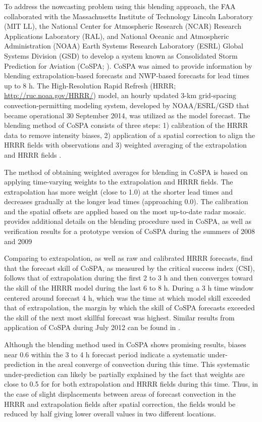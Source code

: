 \documentclass[12pt]{article}
\begin{document}
 To address the nowcasting problem using this blending approach, the FAA collaborated with the Massachusetts Institute of Technology Lincoln Laboratory (MIT LL), the National Center for Atmospheric Research (NCAR) Research Applications Laboratory (RAL), and National Oceanic and Atmospheric Administration (NOAA) Earth Systems Research Laboratory (ESRL) Global Systems Division (GSD) to develop a system known as Consolidated Storm Prediction for Aviation (CoSPA; \citealt{wolfson08, dupree09}). CoSPA was aimed to provide information by blending extrapolation-based forecasts and NWP-based forecasts for lead times up to 8 h. The High-Resolution Rapid Refresh (HRRR; \url{http://ruc.noaa.gov/HRRR/}) model, an hourly updated 3-km grid-spacing convection-permitting modeling system, developed by NOAA/ESRL/GSD that became operational 30 September 2014, was utilized as the model forecast. The blending method of CoSPA consists of  three steps: 1) calibration of the HRRR data to remove intensity biases, 2) application of a spatial correction to align the HRRR fields with observations and 3) weighted averaging of the extrapolation and  HRRR fields \citep{pinto++10}. 

 The method of obtaining weighted averages for blending in CoSPA is based on applying time-varying weights to the extrapolation and HRRR fields. The extrapolation has more weight (close to 1.0) at the shorter lead times and decreases gradually at the longer lead times (approaching 0.0). The calibration and the spatial offsets are applied based on the most up-to-date radar mosaic. \citet{pinto++10} provides additional details on the blending procedure used in CoSPA, as well as verification results for a prototype version of CoSPA during the summers of 2008 and 2009
 
 Comparing to extrapolation, as well as raw and calibrated HRRR forecasts, \citet{pinto++10} find that the forecast skill of CoSPA, as measured by the critical success index (CSI), follows that of extrapolation during the first 2 to 3 h and then converges toward the skill of the HRRR model during the last 6 to 8 h. During a 3 h time window centered around forecast 4 h, which was the time at which model skill exceeded that of extrapolation, the margin by which the skill of CoSPA forecasts exceeded the skill of the next most skillful forecast was highest. Similar results from application of CoSPA during July 2012 can be found in \citet{sun14}.
 
 Although the blending method used in CoSPA shows promising results, biases near 0.6 within the 3 to 4 h forecast period indicate a systematic under-prediction in the areal converge of convection during this time. This systematic under-prediction can likely be partially explained by the fact that weights are close to 0.5 for for both extrapolation and HRRR fields during this time. Thus, in the case of slight displacements between areas of forecast convection in the HRRR and extrapolation fields after spatial correction, the fields would be reduced by half giving lower overall values in two different locations. 
 
\end{document}
